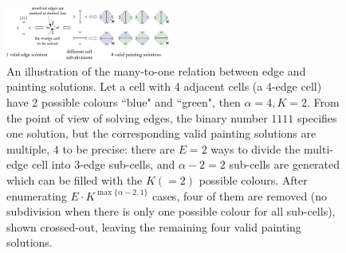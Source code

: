 \documentclass[journal]{IEEEtran}
\begin{document}
\begin{figure}[t]
\centering
\includegraphics[width = 0.48\textwidth]{figures/many_to_one_3}
\caption{An illustration of the many-to-one relation between edge and painting solutions. 
Let a cell with $4$ adjacent cells (a $4$-edge cell) have 2 possible colours ``blue" and ``green", then $\alpha = 4, K = 2$. From the point of view of solving edges, the binary number $1111$ specifies one solution, but the corresponding valid painting solutions are multiple, $4$ to be precise: there are $E=2$ ways to divide the multi-edge cell into $3$-edge sub-cells, and $\alpha-2 = 2$ sub-cells are generated which can be filled with the $K (=2)$ possible colours. After enumerating $E\cdot K^{\max\{\alpha-2, 1\}}$ cases, four of them are removed (no subdivision when there is only one possible colour for all sub-cells), shown crossed-out, leaving the remaining four valid painting solutions.
}
\label{fig:many_to_one}
\end{figure}
\end{document}
